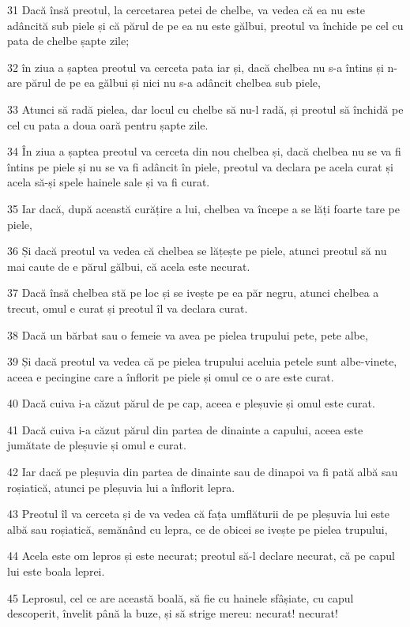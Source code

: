 \par 31 Dacă însă preotul, la cercetarea petei de chelbe, va vedea că ea nu este adâncită sub piele și că părul de pe ea nu este gălbui, preotul va închide pe cel cu pata de chelbe șapte zile;
\par 32 în ziua a șaptea preotul va cerceta pata iar și, dacă chelbea nu s-a întins și n-are părul de pe ea gălbui și nici nu s-a adâncit chelbea sub piele,
\par 33 Atunci să radă pielea, dar locul cu chelbe să nu-l radă, și preotul să închidă pe cel cu pata a doua oară pentru șapte zile.
\par 34 În ziua a șaptea preotul va cerceta din nou chelbea și, dacă chelbea nu se va fi întins pe piele și nu se va fi adâncit în piele, preotul va declara pe acela curat și acela să-și spele hainele sale și va fi curat.
\par 35 Iar dacă, după această curățire a lui, chelbea va începe a se lăți foarte tare pe piele,
\par 36 Și dacă preotul va vedea că chelbea se lățește pe piele, atunci preotul să nu mai caute de e părul gălbui, că acela este necurat.
\par 37 Dacă însă chelbea stă pe loc și se ivește pe ea păr negru, atunci chelbea a trecut, omul e curat și preotul îl va declara curat.
\par 38 Dacă un bărbat sau o femeie va avea pe pielea trupului pete, pete albe,
\par 39 Și dacă preotul va vedea că pe pielea trupului aceluia petele sunt albe-vinete, aceea e pecingine care a înflorit pe piele și omul ce o are este curat.
\par 40 Dacă cuiva i-a căzut părul de pe cap, aceea e pleșuvie și omul este curat.
\par 41 Dacă cuiva i-a căzut părul din partea de dinainte a capului, aceea este jumătate de pleșuvie și omul e curat.
\par 42 Iar dacă pe pleșuvia din partea de dinainte sau de dinapoi va fi pată albă sau roșiatică, atunci pe pleșuvia lui a înflorit lepra.
\par 43 Preotul îl va cerceta și de va vedea că fața umflăturii de pe pleșuvia lui este albă sau roșiatică, semănând cu lepra, ce de obicei se ivește pe pielea trupului,
\par 44 Acela este om lepros și este necurat; preotul să-l declare necurat, că pe capul lui este boala leprei.
\par 45 Leprosul, cel ce are această boală, să fie cu hainele sfâșiate, cu capul descoperit, învelit până la buze, și să strige mereu: necurat! necurat!

